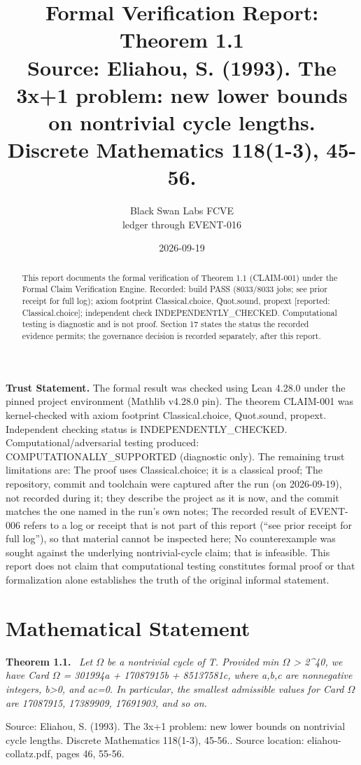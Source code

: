 \documentclass[11pt]{article}
\title{Formal Verification Report: Theorem 1.1\\[0.5em]{\large Source: Eliahou, S. (1993). The 3x+1 problem: new lower bounds on nontrivial cycle lengths. Discrete Mathematics 118(1-3), 45-56.}}
\author{Black Swan Labs FCVE \\ ledger through EVENT-016}
\date{2026-09-19}
\newenvironment{sourceresult}[1]{\par\medskip\noindent\textbf{#1.}\ \itshape}{\par\medskip}
\begin{document}
\maketitle

\noindent\textbf{Trust Statement.} The formal result was checked using Lean 4.28.0 under the pinned project environment (Mathlib v4.28.0 pin). The theorem CLAIM-001 was kernel-checked with axiom footprint Classical.choice, Quot.sound, propext. Independent checking status is INDEPENDENTLY\_CHECKED. Computational/adversarial testing produced: COMPUTATIONALLY\_SUPPORTED (diagnostic only). The remaining trust limitations are: The proof uses Classical.choice; it is a classical proof; The repository, commit and toolchain were captured after the run (on 2026-09-19), not recorded during it; they describe the project as it is now, and the commit matches the one named in the run's own notes; The recorded result of EVENT-006 refers to a log or receipt that is not part of this report (``see prior receipt for full log''), so that material cannot be inspected here; No counterexample was sought against the underlying nontrivial-cycle claim; that is infeasible. This report does not claim that computational testing constitutes formal proof or that formalization alone establishes the truth of the original informal statement.

\begin{abstract}
This report documents the formal verification of Theorem 1.1 (CLAIM-001) under the Formal Claim Verification Engine. Recorded: build PASS (8033/8033 jobs; see prior receipt for full log); axiom footprint Classical.choice, Quot.sound, propext  [reported: Classical.choice]; independent check INDEPENDENTLY\_CHECKED. Computational testing is diagnostic and is not proof. Section 17 states the status the recorded evidence permits; the governance decision is recorded separately, after this report.
\end{abstract}

\section{Mathematical Statement}
\begin{sourceresult}{Theorem 1.1}
Let \ensuremath{\Omega} be a nontrivial cycle of T. Provided min \ensuremath{\Omega} > 2\textasciicircum{}40, we have Card \ensuremath{\Omega} = 301994a + 17087915b + 85137581c, where a,b,c are nonnegative integers, b>0, and ac=0. In particular, the smallest admissible values for Card \ensuremath{\Omega} are 17087915, 17389909, 17691903, and so on.
\end{sourceresult}
Source: Eliahou, S. (1993). The 3x+1 problem: new lower bounds on nontrivial cycle lengths. Discrete Mathematics 118(1-3), 45-56.. Source location: eliahou-collatz.pdf, pages 46, 55-56.
\end{document}
